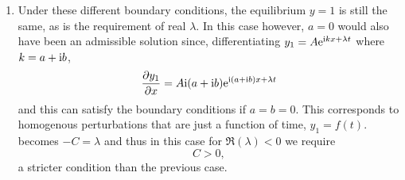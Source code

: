 \documentclass[a4paper, 12pt]{article}
\begin{document}
\begin{enumerate}[label={\bf \arabic{*}.\;}, ref={\arabic{*}},itemsep=3ex, left=0ex]
{\begin{enumerate}[label=(\alph*)]
{            Going back to $k$, if we say $k = a + \i b$, then \cref{eq-omega-0} tells us
            \begin{equation}
              -(a^2 - b^2) -2\i ab   + \i a -b -C = \lambda.
              \label{eq-omega}
            \end{equation}
            For the imaginary part of $\lambda$ to vanish we need
            \begin{equation}
              a - 2ab = 0\implies a =0 \text{ or } b=\frac12.
            \end{equation}
            Since we know $a=n\pi/L \neq 0$, we have that $b=1/2$.
            The equilibrium is stable when $\Re(\lambda) < 0$. We therefore need
            \begin{equation}
              \lambda = -a^2 + \frac14 - \frac12 - C < 0 \implies -a^2 < \frac14 + C.
            \end{equation}
            The lowest possible nonzero value of $a$ is $\pi/L$ so
            \begin{equation}
              C>-\frac{\pi^2}{L^2} - \frac14.
            \end{equation}
            The linearised solutions take on the form
            \begin{equation}
              y_1 = A\e^{\i (n \pi /L + \i/2)x+\lambda t} = B\e ^{-x/2+\lambda t}\sin\left(\frac{n\pi x}{L}\right),
            \end{equation}
            where $A = -\i B$.
          }
        \item{Under these different boundary conditions, the equilibrium $y=1$ is still the same, as is the requirement of real $\lambda$. In this case however, $a=0$ would also have been an admissible solution since, differentiating $y_1 = A\mathrm{e}^{\mathrm{i} kx +\lambda t}$ where $k=a+\i b$,
            \begin{equation}
              \pd{y_1}{x} = A\i(a + \i b)\e ^{\i (a + \i b)x + \lambda t}
            \end{equation}
            and this can satisfy the boundary conditions if $a = b =0$. This corresponds to homogenous perturbations that are just a function of time, $y_1 = f(t)$.  becomes $-C=\lambda$ and thus in this case for $\Re(\lambda) < 0$ we require
            \begin{equation}
              C >0,
            \end{equation}
            a stricter condition than the previous case.
          }
      \end{enumerate}

}
\end{enumerate}
\end{document}
